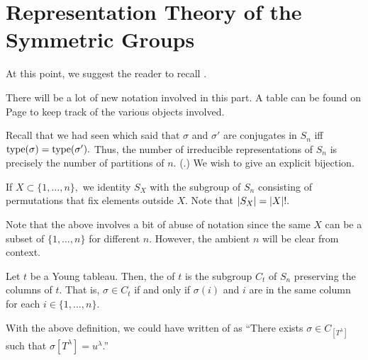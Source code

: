 \section{Representation Theory of the Symmetric Groups}

At this point, we suggest the reader to recall .

There will be a lot of new notation involved in this part. A table can be found on Page \pageref{bookkeeping} to keep track of the various objects involved.

\begin{rem} \label{rem:irredrepsconjclassSn}
	Recall that we had seen  which said that $\sigma$ and $\sigma'$ are conjugates in $S_n$ iff $\operatorname{type}(\sigma) = \operatorname{type}(\sigma').$ Thus, the number of irreducible representations of $S_n$ is precisely the number of partitions of $n.$ (.) We wish to give an explicit bijection.
\end{rem}

\begin{defn}%
	If $X \subset \{1, \ldots, n\},$ we identity $S_X$ with the subgroup of $S_n$ consisting of permutations that fix elements outside $X.$ Note that ${\left\lvert S_{X} \right\lvert} = {\left\lvert X \right\lvert}!.$
\end{defn}
Note that the above involves a bit of abuse of notation since the same $X$ can be a subset of $\{1, \ldots, n\}$ for different $n.$ However, the ambient $n$ will be clear from context.

\begin{defn}%
	Let $t$ be a Young tableau. Then, the  of $t$ is the subgroup $C_t$ of $S_n$ preserving the columns of $t.$ That is, $\sigma \in C_t$ if and only if $\sigma(i)$ and $i$ are in the same column for each $i \in \{1, \ldots, n\}.$
\end{defn}

With the above definition, we could have written  of  as ``There exists $\sigma \in C_{[T^\lambda]}$ such that $\sigma [T^\lambda] = u^\lambda$.''


